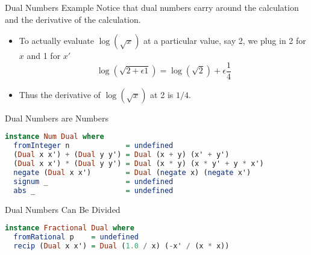 \documentclass{beamer}
\begin{document}
\begin{frame}[fragile]{Dual Numbers Example}
Notice that dual numbers carry around the calculation and the
derivative of the calculation.

\begin{itemize}
\pause
\item
To actually evaluate $\log(\sqrt{x})$
at a particular value, say 2, we plug in 2 for $x$ and 1 for $x'$
$$
\log (\sqrt{2 + \epsilon 1}) = \log(\sqrt{2}) + \epsilon\frac{1}{4}
$$
\pause
\item
Thus the derivative of $\log(\sqrt{x})$ at 2 is $1/4$.
\end{itemize}
\end{frame}

\begin{frame}[fragile]{Dual Numbers are Numbers}
\begin{scriptsize}
\begin{lstlisting}[language=Haskell]
instance Num Dual where
  fromInteger n             = undefined
  (Dual x x') + (Dual y y') = Dual (x + y) (x' + y')
  (Dual x x') * (Dual y y') = Dual (x * y) (x * y' + y * x')
  negate (Dual x x')        = Dual (negate x) (negate x')
  signum _                  = undefined
  abs _                     = undefined
\end{lstlisting}
\end{scriptsize}
\end{frame}

\begin{frame}[fragile]{Dual Numbers Can Be Divided}
\begin{scriptsize}
\begin{lstlisting}[language=Haskell]
instance Fractional Dual where
  fromRational p    = undefined
  recip (Dual x x') = Dual (1.0 / x) (-x' / (x * x))
\end{lstlisting}
\end{scriptsize}
\end{frame}
\end{document}
